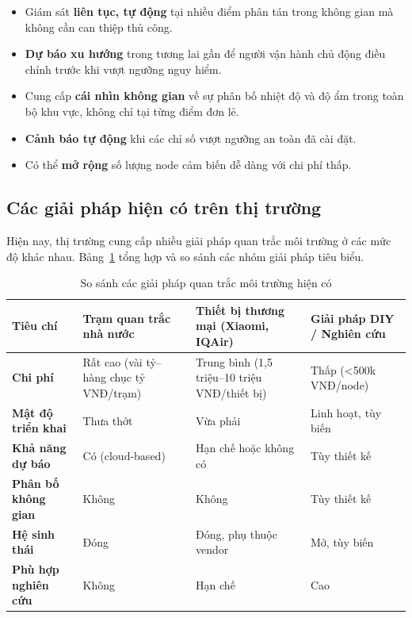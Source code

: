 \begin{itemize}[leftmargin=2cm]
  \item Giám sát \textbf{liên tục, tự động} tại nhiều điểm phân tán
    trong không gian mà không cần can thiệp thủ công.
  \item \textbf{Dự báo xu hướng} trong tương lai gần để người vận hành
    chủ động điều chỉnh trước khi vượt ngưỡng nguy hiểm.
  \item Cung cấp \textbf{cái nhìn không gian} về sự phân bố nhiệt độ
    và độ ẩm trong toàn bộ khu vực, không chỉ tại từng điểm đơn lẻ.
  \item \textbf{Cảnh báo tự động} khi các chỉ số vượt ngưỡng an toàn
    đã cài đặt.
  \item Có thể \textbf{mở rộng} số lượng node cảm biến dễ dàng với chi
    phí thấp.
\end{itemize}

\subsection{Các giải pháp hiện có trên thị trường}
\label{subsec:survey:existing}

Hiện nay, thị trường cung cấp nhiều giải pháp quan trắc môi trường ở
các mức độ khác nhau. Bảng~\ref{tab:compare_solutions} tổng hợp và so
sánh các nhóm giải pháp tiêu biểu.

\begin{table}[H]
  \centering
  \caption{So sánh các giải pháp quan trắc môi trường hiện có}
  \label{tab:compare_solutions}
  \begin{tabularx}{\textwidth}{>{\bfseries}p{3cm} X X X}
    \toprule
    Tiêu chí
      & Trạm quan trắc nhà nước
      & Thiết bị thương mại (Xiaomi, IQAir)
      & Giải pháp DIY / Nghiên cứu \\
    \midrule
    Chi phí
      & Rất cao (vài tỷ--hàng chục tỷ VNĐ/trạm)
      & Trung bình (1,5 triệu--10 triệu VNĐ/thiết bị)
      & Thấp (<500k VNĐ/node) \\
    Mật độ triển khai
      & Thưa thớt
      & Vừa phải
      & Linh hoạt, tùy biến \\
    Khả năng dự báo
      & Có (cloud-based)
      & Hạn chế hoặc không có
      & Tùy thiết kế \\
    Phân bố không gian
      & Không
      & Không
      & Tùy thiết kế \\
    Hệ sinh thái
      & Đóng
      & Đóng, phụ thuộc vendor
      & Mở, tùy biến \\
    Phù hợp nghiên cứu
      & Không
      & Hạn chế
      & Cao \\
    \bottomrule
  \end{tabularx}
\end{table}

